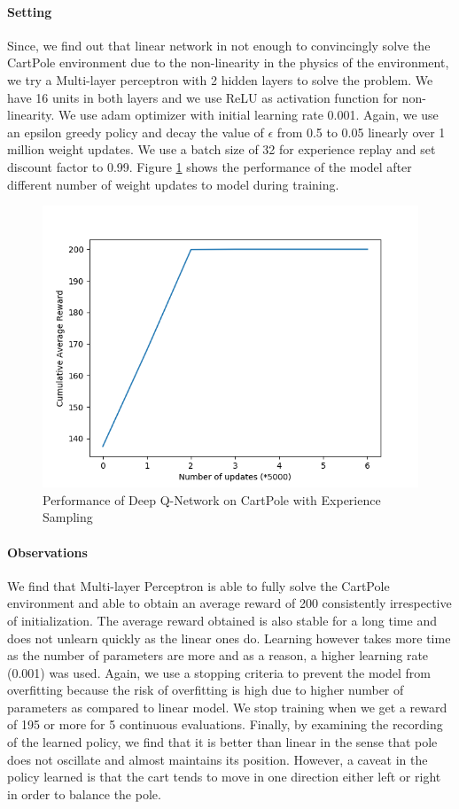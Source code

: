 \documentclass[12pt]{article}
\begin{document}
\paragraph{Setting} Since, we find out that linear network in not enough to convincingly solve the CartPole environment due to the non-linearity in the physics of the environment, we try a Multi-layer perceptron with 2 hidden layers to solve the problem. We have 16 units in both layers and we use ReLU as activation function for non-linearity. We use adam optimizer with initial learning rate 0.001. Again, we use an epsilon greedy policy and decay the value of $\epsilon$ from 0.5 to 0.05 linearly over 1 million weight updates. We use a batch size of 32 for experience replay and set discount factor to 0.99. Figure \ref{fig:03} shows the performance of the model after different number of weight updates to model during training.
\begin{figure}[h]
  \centering
  \vspace{-5mm}
  \includegraphics[width=0.8\linewidth]{figures/reward_plot_04.png}
  \caption{Performance of Deep Q-Network on CartPole with Experience Sampling}
  \label{fig:03}
\end{figure}
\paragraph{Observations} We find that Multi-layer Perceptron is able to fully solve the CartPole environment and able to obtain an average reward of 200 consistently irrespective of initialization. The average reward obtained is also stable for a long time and does not unlearn quickly as the linear ones do. Learning however takes more time as the number of parameters are more and as a reason, a higher learning rate (0.001) was used. Again, we use a stopping criteria to prevent the model from overfitting because the risk of overfitting is high due to higher number of parameters as compared to linear model. We stop training when we get a reward of 195 or more for 5 continuous evaluations. Finally, by examining the recording of the learned policy, we find that it is better than linear in the sense that pole does not oscillate and almost maintains its position. However, a caveat in the policy learned is that the cart tends to move in one direction either left or right in order to balance the pole.
\end{document}
